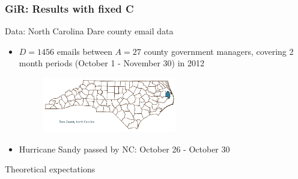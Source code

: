 \documentclass[10pt]{beamer}
\def\bni{\begin{itemize}} \def\ei{\end{itemize}}
\theoremstyle{definition}
\theoremstyle{remark}
\begin{document}
\begin{frame} \frametitle{GiR: Results with fixed C}

\end{frame}


\begin{frame}{Data: North Carolina Dare county email data}
 \bni \item $D = 1456$ emails between $A = 27$ county government managers, covering 2 month periods (October 1 - November 30) in 2012
 \begin{figure}
 	\includegraphics[width=0.55\textwidth]{figures/Dare.png}
 \end{figure}	
\vspace{0.4cm}
 \item Hurricane Sandy passed by NC: October 26 - October 30
 \ei
\end{frame}


\begin{frame}{Theoretical expectations}

\end{frame}
\end{document}

